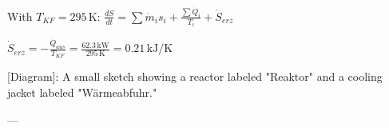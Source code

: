 With \( T_{KF} = 295 \, \text{K} \):  
\( \frac{dS}{dt} = \sum \dot{m}_i s_i + \frac{\sum \dot{Q}_i}{T_i} + \dot{S}_{erz} \)  

\( \dot{S}_{erz} = -\frac{\dot{Q}_{aus}}{T_{KF}} = \frac{62.3 \, \text{kW}}{295 \, \text{K}} = 0.21 \, \text{kJ/K} \)  

[Diagram]: A small sketch showing a reactor labeled "Reaktor" and a cooling jacket labeled "Wärmeabfuhr."

---